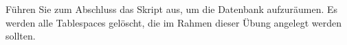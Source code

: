     \item Führen Sie zum Abschluss das Skript  aus, um die Datenbank aufzuräumen. Es werden alle Tablespaces gelöscht, die im Rahmen dieser Übung angelegt werden sollten.
